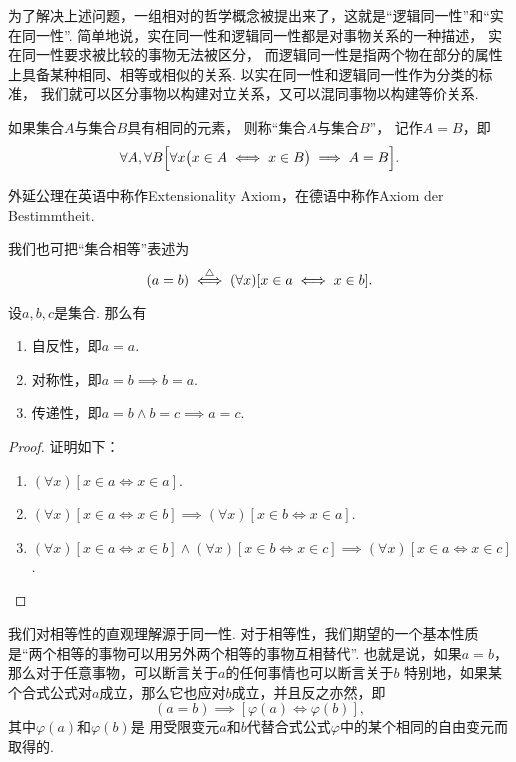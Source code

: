 为了解决上述问题，一组相对的哲学概念被提出来了，这就是“逻辑同一性”和“实在同一性”.
简单地说，实在同一性和逻辑同一性都是对事物关系的一种描述，
实在同一性要求被比较的事物无法被区分，
而逻辑同一性是指两个物在部分的属性上具备某种相同、相等或相似的关系.
以实在同一性和逻辑同一性作为分类的标准，
我们就可以区分事物以构建对立关系，又可以混同事物以构建等价关系.


\begin{axiom}[外延公理I]
如果集合\(A\)与集合\(B\)具有相同的元素，
则称“集合\(A\)与集合\(B\)”，
记作\(A=B\)，即
\begin{equation}
	\forall A, \forall B \Bigl[
		\forall x \bigl( x \in A \iff x \in B \bigr)
		\implies
		A = B
	\Bigr].
\end{equation}
\end{axiom}
外延公理在英语中称作Extensionality Axiom，在德语中称作Axiom der Bestimmtheit.

我们也可把“集合相等”表述为
\begin{equation}
	(a=b)
	\overset{\triangle}{\iff}
	(\forall x)[x \in a \iff x \in b].
\end{equation}

\begin{property}
设\(a,b,c\)是集合.
那么有\begin{enumerate}
	\item\label{item:集合论.集合相等的自反性}
	自反性，即\(a=a\).
	\item\label{item:集合论.集合相等的对称性}
	对称性，即\(a=b \implies b=a\).
	\item\label{item:集合论.集合相等的传递性}
	传递性，即\(a=b \land b=c \implies a=c\).
\end{enumerate}
\begin{proof}
证明如下：
\begin{enumerate}
	\item \((\forall x)[x \in a \iff x \in a]\).
	\item \((\forall x)[x \in a \iff x \in b] \implies (\forall x)[x \in b \iff x \in a]\).
	\item \((\forall x)[x \in a \iff x \in b] \land (\forall x)[x \in b \iff x \in c]
	\implies (\forall x)[x \in a \iff x \in c]\).
	\qedhere
\end{enumerate}
\end{proof}
\end{property}

我们对相等性的直观理解源于同一性.
对于相等性，我们期望的一个基本性质是“两个相等的事物可以用另外两个相等的事物互相替代”.
也就是说，如果\(a=b\)，那么对于任意事物，可以断言关于\(a\)的任何事情也可以断言关于\(b\)
特别地，如果某个合式公式对\(a\)成立，那么它也应对\(b\)成立，并且反之亦然，即\[
	(a=b)\implies[\varphi(a)\iff\varphi(b)],
\]
其中\(\varphi(a)\)和\(\varphi(b)\)是%
用受限变元\(a\)和\(b\)代替合式公式\(\varphi\)中的某个相同的自由变元而取得的.


